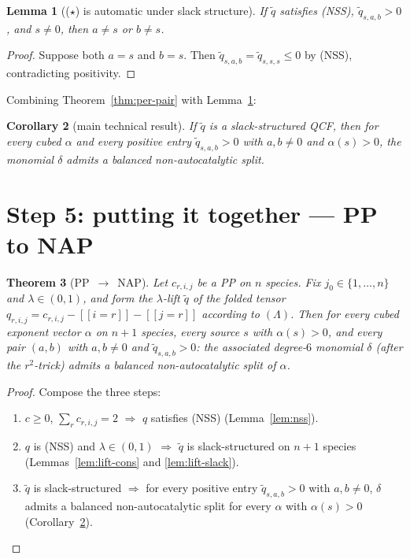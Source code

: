 \documentclass[11pt]{article}
\newtheorem{theorem}{Theorem}
\newtheorem{lemma}[theorem]{Lemma}
\newtheorem{corollary}[theorem]{Corollary}
\newcommand{\iv}[1]{[\![#1]\!]}
\begin{document}
\begin{lemma}[($\star$) is automatic under slack structure]
\label{lem:star-auto}
If $\widetilde q$ satisfies (NSS), $\widetilde q_{s,a,b} > 0$, and
$s \ne 0$, then $a \ne s$ or $b \ne s$.
\end{lemma}
\begin{proof}
Suppose both $a = s$ and $b = s$. Then $\widetilde q_{s,a,b} =
\widetilde q_{s,s,s} \le 0$ by (NSS), contradicting positivity.
\end{proof}

Combining Theorem~\ref{thm:per-pair} with Lemma~\ref{lem:star-auto}:

\begin{corollary}[main technical result]
\label{cor:quad-split}
If $\widetilde q$ is a slack-structured QCF, then for every cubed
$\alpha$ and every positive entry $\widetilde q_{s,a,b} > 0$ with
$a, b \ne 0$ and $\alpha(s) > 0$, the monomial $\delta$ admits a
balanced non-autocatalytic split.
\end{corollary}

\section{Step 5: putting it together --- PP to NAP}

\begin{theorem}[PP~$\to$~NAP]
\label{thm:main}
Let $c_{r,i,j}$ be a PP on $n$ species. Fix $j_0 \in \{1,\dots,n\}$ and
$\lambda \in (0,1)$, and form the $\lambda$-lift $\widetilde q$ of the
folded tensor $q_{r,i,j} = c_{r,i,j} - \iv{i=r} - \iv{j=r}$ according to
$(\Lambda)$. Then for every cubed exponent vector $\alpha$ on $n+1$
species, every source $s$ with $\alpha(s) > 0$, and every pair $(a,b)$
with $a, b \ne 0$ and $\widetilde q_{s,a,b} > 0$: the associated
degree-$6$ monomial $\delta$ (after the $r^2$-trick) admits a balanced
non-autocatalytic split of $\alpha$.
\end{theorem}
\begin{proof}
Compose the three steps:
\begin{enumerate}
\item $c \ge 0$, $\sum_r c_{r,i,j} = 2$ $\Rightarrow$ $q$ satisfies
(NSS) (Lemma~\ref{lem:nss}).
\item $q$ is (NSS) and $\lambda \in (0,1)$ $\Rightarrow$ $\widetilde q$
is slack-structured on $n+1$ species (Lemmas~\ref{lem:lift-cons} and
\ref{lem:lift-slack}).
\item $\widetilde q$ is slack-structured $\Rightarrow$ for every
positive entry $\widetilde q_{s,a,b} > 0$ with $a,b \ne 0$, $\delta$
admits a balanced non-autocatalytic split for every $\alpha$ with
$\alpha(s) > 0$ (Corollary~\ref{cor:quad-split}).
\end{enumerate}
\end{proof}
\end{document}
